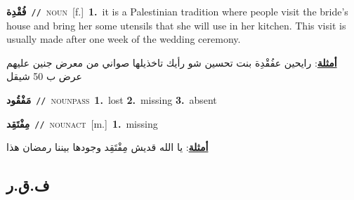 \documentclass[10pt,a4paper,twoside]{article} %
\begin{document}
\begin{multicols}{2}
{\setlength\topsep{0pt}\textbf{\foreignlanguage{arabic}{فُقْدِة}}\ {\color{gray}\texttt{//}\color{black}}\ \textsc{noun}\ [f.]\ \textbf{1.}~it is a Palestinian tradition where people visit the bride's house and bring her some utensils that she will use in her kitchen. This visit is usually made after one week of the wedding ceremony.\  \begin{flushright}\color{gray}\foreignlanguage{arabic}{\textbf{\underline{\foreignlanguage{arabic}{أمثلة}}}: رايحين عفُقْدِة بنت تحسين شو رأيك تاخذيلها صواني من معرض جنين عليهم عرض ب 50 شيقل}\end{flushright}\color{black}} \vspace{2mm}

{\setlength\topsep{0pt}\textbf{\foreignlanguage{arabic}{مَفْقُود}}\ {\color{gray}\texttt{//}\color{black}}\ \textsc{noun\textunderscore pass}\ \textbf{1.}~lost  \textbf{2.}~missing  \textbf{3.}~absent\ } \vspace{2mm}

{\setlength\topsep{0pt}\textbf{\foreignlanguage{arabic}{مِفْتَقِد}}\ {\color{gray}\texttt{//}\color{black}}\ \textsc{noun\textunderscore act}\ [m.]\ \textbf{1.}~missing\  \begin{flushright}\color{gray}\foreignlanguage{arabic}{\textbf{\underline{\foreignlanguage{arabic}{أمثلة}}}: يا الله قديش مِفْتَقِد وجودها بيننا رمضان هذا}\end{flushright}\color{black}} \vspace{2mm}

\vspace{-3mm}
\subsection*{\color{blue}\foreignlanguage{arabic}{ف.ق.ر}\color{blue}{}} 


\end{multicols}
\end{document}
